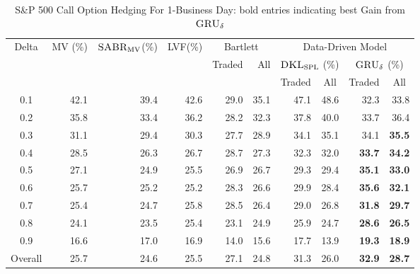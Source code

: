 \documentclass[letterpaper,12pt,titlepage,oneside,final]{book}
\numberwithin{equation}{section}
\theoremstyle{definition}
\newcommand{\model}{\textsc{GRU}_\delta}
\newcommand{\DKLs}{\bf\textsc{DKL}_{\text{SPL}}}
\newcommand{\LVF}{\textsc{LVF}}
\newcommand{\SABR}{\bf\textsc{SABR}_{\text{MV}}}
\begin{document}
\begin{table}[htp!]
\centering
\begin{threeparttable}
\begin{tabular}{|c |r r r r r r r r r|}
\hline
\multirow{3}{*}{Delta}&\multirow{3}{*}{MV (\%)}&\multirow{3}{*}{\;$\SABR$(\%)}&\multirow{3}{*}{\LVF (\%)}&\multicolumn{2}{c|}{Bartlett}& \multicolumn{4}{c|}{Data-Driven Model}\\
&&&&\multirow{2}{*}{Traded}&\multirow{2}{*}{All}&\multicolumn{2}{|c}{$\DKLs$ (\%)} &\multicolumn{2}{c|}{$\model$ (\%)}\\
&&&&&&\multicolumn{1}{|c}{\small Traded}&\multicolumn{1}{c}{\small All}&\multicolumn{1}{c}{\small Traded}&\multicolumn{1}{c|}{\small All}\\ \hline
  0.1 & 42.1 & 39.4 & 42.6 &29.0 &35.1    & 47.1  & 48.6        &32.3          &   33.8        \\
  0.2 & 35.8 & 33.4 & 36.2 &28.2 &32.3    & 37.8  & 40.0        &33.7          &   36.4        \\
  0.3 & 31.1 & 29.4 & 30.3 &27.7 &28.9   & 34.1  & 35.1        &34.1          &\textbf{35.5}        \\
  0.4 & 28.5 & 26.3 & 26.7 &28.7 &27.3   & 32.3  & 32.0        &\textbf{33.7} &\textbf{34.2}    \\
  0.5 & 27.1 & 24.9 & 25.5 &26.9 &26.7   & 29.3  & 29.4        &\textbf{35.1} &\textbf{33.0}   \\
  0.6 & 25.7 & 25.2 & 25.2 &28.3 &26.6   & 29.9  & 28.4        &\textbf{35.6} &\textbf{32.1}    \\
  0.7 & 25.4 & 24.7 & 25.8 &28.5 &26.4   & 29.0  & 26.8        &\textbf{31.8} &\textbf{29.7}   \\
  0.8 & 24.1 & 23.5 & 25.4 &23.1 &24.9   & 25.9  & 24.7        &\textbf{28.6} &\textbf{26.5}   \\
  0.9 & 16.6 & 17.0 & 16.9 &14.0 &15.6   & 17.7  & 13.9        &\textbf{19.3} &\textbf{18.9}    \\
  Overall & 25.7 & 24.6 & 25.5 &27.1 &24.8 & 31.3  & 26.0        &\textbf{32.9} & \textbf{28.7} \\
  \hline
\end{tabular}
\caption{S\&P 500 Call Option Hedging For 1-Business Day: bold entries indicating best Gain from $\model$}
\label{SP500Call}

\end{threeparttable}
\end{table}
\end{document}
